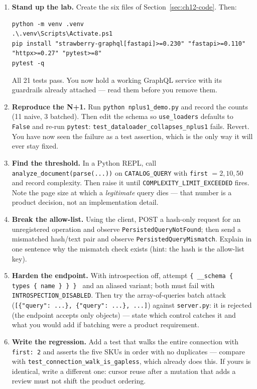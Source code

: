 \begin{enumerate}
  \item \textbf{Stand up the lab.} Create the six files of
        Section~\ref{sec:ch12-code}. Then:
\begin{verbatim}
python -m venv .venv
.\.venv\Scripts\Activate.ps1
pip install "strawberry-graphql[fastapi]>=0.230" "fastapi>=0.110" "httpx>=0.27" "pytest>=8"
pytest -q
\end{verbatim}
        All 21 tests pass. You now hold a working GraphQL service with its
        guardrails already attached --- read them before you remove them.
  \item \textbf{Reproduce the N+1.} Run \texttt{python nplus1\_demo.py}
        and record the counts (11 naive, 3 batched). Then edit the schema
        so \texttt{use\_loaders} defaults to \texttt{False} and re-run
        \texttt{pytest}: \texttt{test\_dataloader\_collapses\_nplus1}
        fails. Revert. You have now seen the failure as a test assertion,
        which is the only way it will ever stay fixed.
  \item \textbf{Find the threshold.} In a Python REPL, call
        \texttt{analyze\_document(parse(...))} on
        \texttt{CATALOG\_QUERY} with \texttt{first} $= 2, 10, 50$ and
        record complexity. Then raise it until
        \texttt{COMPLEXITY\_LIMIT\_EXCEEDED} fires. Note the page size at
        which a \emph{legitimate} query dies --- that number is a product
        decision, not an implementation detail.
  \item \textbf{Break the allow-list.} Using the client, POST a hash-only
        request for an unregistered operation and observe
        \texttt{PersistedQueryNotFound}; then send a mismatched hash/text
        pair and observe \texttt{PersistedQueryMismatch}. Explain in one
        sentence why the mismatch check exists (hint: the hash is the
        allow-list key).
  \item \textbf{Harden the endpoint.} With introspection off, attempt
        \texttt{\{ \_\_schema \{ types \{ name \} \} \} } and an
        aliased variant; both must fail with
        \texttt{INTROSPECTION\_DISABLED}. Then try the array-of-queries
        batch attack (\texttt{[\{"query": ...\}, \{"query": ...\}, ...]})
        against \texttt{server.py}: it is rejected (the endpoint accepts
        only objects) --- state which control catches it and what you
        would add if batching were a product requirement.
  \item \textbf{Write the regression.} Add a test that walks the entire
        connection with \texttt{first: 2} and asserts the five SKUs in
        order with no duplicates --- compare with
        \texttt{test\_connection\_walk\_is\_gapless}, which already does
        this. If yours is identical, write a different one: cursor reuse
        after a mutation that adds a review must not shift the product
        ordering.
\end{enumerate}

